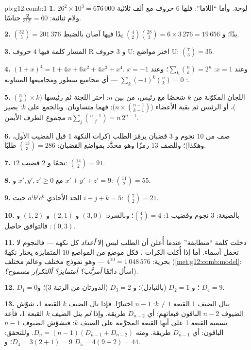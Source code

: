 \begin{solution}{pb:g12:comb:1}
\textbf{1.} $26^2 \times 10^3 = 676\,000$ لوحة. وأما ``اللاما'': فلها $6$
حروف مع ألف ثلاثية ولام ثنائية:
$\frac{6!}{3!\,2!} = 60$ جناسًا.

\textbf{2.} $\binom{32}{5} = 201\,376$ يدًا؛ و
$\binom42 \binom{28}{3} = 6 \times 3\,276 = 19\,656$ يدًا فيها
آصان بالضبط.

\textbf{3.} المسار كلمة فيها $4$ حروف R و $3$ حروف U: اختر
مواضع U: $\binom73 = 35$.

\textbf{4.} $(1+x)^4 = 1 + 4x + 6x^2 + 4x^3 + x^4$. وعند
$x = 1$: $\sum_k \binom nk = 2^n$؛ وعند $x = -1$:
$\sum_k (-1)^k \binom nk = 0$ --- أي مجاميع سطور  ومجاميعها
المتناوبة.

\textbf{5.} اللجان المكوّنة من $k$ شخصًا مع رئيس، من بين $n$:
اختر اللجنة ثم رئيسها ($\binom nk \times k$)، أو
الرئيس ثم بقية الأعضاء
($n \times \binom{n-1}{k-1}$): فهما متساويان. وبالجمع على $k$: يصير
مجموع الطرف الأيمن $n \sum_j \binom{n-1}{j} = n\,2^{n-1}$.

\textbf{6.} صف من $10$ نجوم و $3$ قضبان يرمّز الطلب
(كرات النكهة 1 قبل القضيب الأول، وهكذا)؛ وللصف
$13$ رمزًا وهو محدَّد بمواضع القضبان:
$\binom{13}{3} = 286$ طلبًا.

\textbf{7.} $12$ نجمًا و $2$ قضيب: $\binom{14}{2} = 91$.

\textbf{8.} مع $x', y', z' \geq 0$ و
$x' + y' + z' = 9$: $\binom{11}{2} = 55$.

\textbf{9.} الحد الأحادي $a^i b^j c^k$ حيث $i + j + k = 5$:
$\binom72 = 21$.

\textbf{10.} بالصيغة: $3$ نجوم وقضيب $1$: $\binom41 = 4$؛
وبالسرد: $(3,0)$ و $(2,1)$ و $(1,2)$ و $(0,3)$: فالتوافق حاصل.

\textbf{11.} دخلت كلمة ``متطابقة'' عندما أُعلن أن الطلب
ليس إلا \emph{أعداد} كل نكهة --- فالنجوم
لا تحمل أسماء. أما إذا أُكلت الكرات ، فكل موضع من
المواضع $10$ المتمايزة يختار نكهةً بحرية:
$4^{10} = 1\,048\,576$  --- وهو نموذج مختلف وعالم
مختلف (\cref{met:g12:comb:model}: اسأل دائمًا
\emph{أمرتَّب؟ أمتمايز؟ أالتكرار مسموح؟}).

\textbf{12.} $D_1 = 0$؛ و $D_2 = 1$ (بالتبادل)؛ و $D_3 = 2$ (الدورتان
من الرتبة $3$)؛ و $D_4 = 9$.

\textbf{13.} ينال الضيف 1 القبعة $k \neq 1$: $n - 1$ اختيارًا. فإذا
نال الضيف $k$ القبعة 1، شوّش الضيوف $n - 2$ الباقون
قبعاتهم: أي $D_{n-2}$ طريقة. وإذا \emph{لم} ينل الضيف $k$
القبعة 1، فأعد تسمية القبعة 1 على أنها القبعة المحرَّمة على الضيف $k$: فيشوّش
الضيوف $n - 1$ الباقون: أي $D_{n-1}$ طريقة. ومنه
$D_n = (n-1)(D_{n-1} + D_{n-2})$. وللتحقق:
$D_4 = 3(2 + 1) = 9$؛ و $D_5 = 4(9 + 2) = 44$.


\end{solution}
